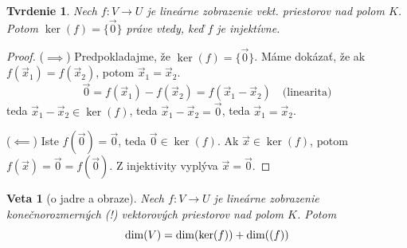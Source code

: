 \documentclass[11pt,a4paper]{article}
\theoremstyle{definition}
\theoremstyle{plain}
\newtheorem{tvrdenie}[definicia]{Tvrdenie}
\newtheorem{veta}[definicia]{Veta}
\theoremstyle{remark}
\let\Im\relax
\DeclareMathOperator{\Im}{Im}
\begin{document}
\begin{tvrdenie} \label{tvr:injektivita}
Nech $f: V \to U$ je lineárne zobrazenie vekt. priestorov nad polom $K$. Potom $\ker(f) = \{ \vec{0} \}$ práve vtedy, keď $f$ je injektívne.
\end{tvrdenie}

\begin{proof}
($\implies$) Predpokladajme, že $\ker(f) = \{ \vec{0} \}$. Máme dokázať, že ak $f(\vec{x}_1) = f(\vec{x}_2)$, potom $\vec{x}_1 = \vec{x}_2$.
\[ \vec{0} = f(\vec{x}_1) - f(\vec{x}_2) = f(\vec{x}_1 - \vec{x}_2) \quad \text{(linearita)} \]
teda $\vec{x}_1 - \vec{x}_2 \in \ker(f)$, teda $\vec{x}_1 - \vec{x}_2 = \vec{0}$, teda $\vec{x}_1 = \vec{x}_2$.

($\impliedby$) Iste $f(\vec{0}) = \vec{0}$, teda $\vec{0} \in \ker(f)$. Ak $\vec{x} \in \ker(f)$, potom $f(\vec{x}) = \vec{0} = f(\vec{0})$. Z injektivity vyplýva $\vec{x} = \vec{0}$.
\end{proof}

\begin{veta}[o jadre a obraze] \label{veta:jadro_obraz}
Nech $f: V \to U$ je lineárne zobrazenie konečnorozmerných (!) vektorových priestorov nad polom $K$. Potom
\[ \dim(V) = \dim(\ker(f)) + \dim(\Im(f)) \]
\end{veta}
\end{document}
